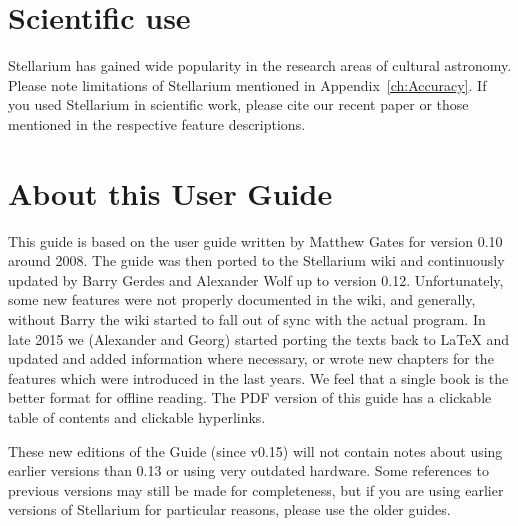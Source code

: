\section{Scientific use}

Stellarium has gained wide popularity in the research areas of
cultural astronomy. Please note limitations of Stellarium mentioned in
Appendix~\ref{ch:Accuracy}. If you used Stellarium in scientific work,
please cite our recent paper \citep{Zotti-etal:JSA2020.6.2} or those
mentioned in the respective feature descriptions.

\section{About this User Guide}
This guide is based on the user guide written by Matthew Gates for
version 0.10 around 2008. The guide was then ported to the Stellarium
wiki and continuously updated by Barry Gerdes and Alexander Wolf up to version 0.12. 
Unfortunately, some new features were not properly documented in the wiki, and generally, 
without Barry the wiki started to fall out of sync with
the actual program.  In late 2015 we (Alexander and Georg) started porting the texts
back to \LaTeX{} and updated and added information where necessary, 
or wrote new chapters for the features which were introduced in the last years. 
We feel that a single book is the better format for offline
reading. The PDF version of this guide has a clickable table of
contents and clickable hyperlinks.

These new editions of the Guide (since v0.15) will not contain notes about using
earlier versions than 0.13 or using very outdated hardware.
Some references to previous versions may still be made for completeness, 
but if you are using earlier versions of Stellarium 
for particular reasons, please use the older guides.


